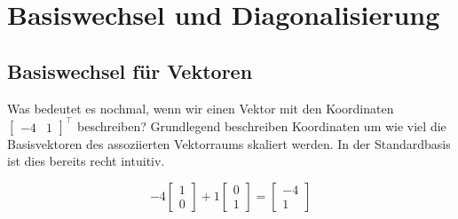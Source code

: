 \setcounter{section}{5}
\section{Basiswechsel und Diagonalisierung}

\subsection{Basiswechsel für Vektoren}

Was bedeutet es nochmal, wenn wir einen Vektor mit den Koordinaten \( \begin{bmatrix} -4 & 1 \end{bmatrix}^\top \) beschreiben? Grundlegend beschreiben Koordinaten um wie viel die Basisvektoren des assoziierten Vektorraums skaliert werden. In der Standardbasis ist dies bereits recht intuitiv. 

\begin{equation*}
    -4 \begin{bmatrix} 1 \\ 0 \end{bmatrix} + 1 \begin{bmatrix} 0 \\ 1 \end{bmatrix} = \begin{bmatrix} -4 \\ 1 \end{bmatrix} 
\end{equation*}

